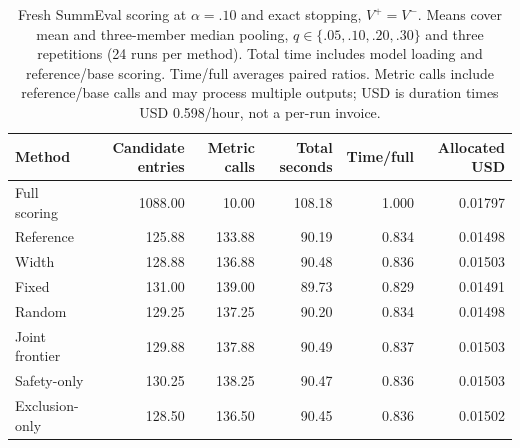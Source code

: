 \begin{table}[t]\centering\small
\begin{tabular}{lrrrrr}\toprule
Method & Candidate entries & Metric calls & Total seconds & Time/full & Allocated USD\\\midrule
Full scoring & 1088.00 & 10.00 & 108.18 & 1.000 & 0.01797 \\
Reference & 125.88 & 133.88 & 90.19 & 0.834 & 0.01498 \\
Width & 128.88 & 136.88 & 90.48 & 0.836 & 0.01503 \\
Fixed & 131.00 & 139.00 & 89.73 & 0.829 & 0.01491 \\
Random & 129.25 & 137.25 & 90.20 & 0.834 & 0.01498 \\
Joint frontier & 129.88 & 137.88 & 90.49 & 0.837 & 0.01503 \\
Safety-only & 130.25 & 138.25 & 90.47 & 0.836 & 0.01503 \\
Exclusion-only & 128.50 & 136.50 & 90.45 & 0.836 & 0.01502 \\
\bottomrule\end{tabular}
\caption{Fresh SummEval scoring at $\alpha=.10$ and exact stopping, $V^+=V^-$. Means cover mean and three-member median pooling, $q\in\{.05,.10,.20,.30\}$ and three repetitions (24 runs per method). Total time includes model loading and reference/base scoring. Time/full averages paired ratios. Metric calls include reference/base calls and may process multiple outputs; USD is duration times USD 0.598/hour, not a per-run invoice.}
\label{tab:real-scoring-exact}\end{table}
